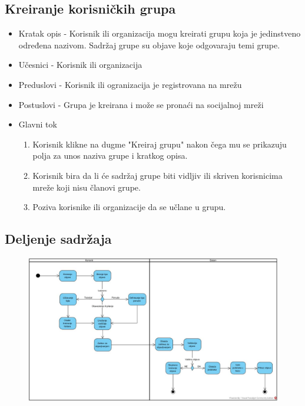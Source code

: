 \subsection{Kreiranje korisničkih grupa}
\begin{itemize}
	\item Kratak opis - Korisnik ili organizacija mogu kreirati grupu koja je jedinstveno određena nazivom. Sadržaj grupe su objave koje odgovaraju temi grupe.
	\item Učesnici - Korisnik ili organizacija
	\item Preduslovi - Korisnik ili ogranizacija je registrovana na mrežu
	\item Postuslovi - Grupa je kreirana i može se pronaći na socijalnoj mreži 
	\item Glavni tok
    \begin{enumerate}
		\item Korisnik klikne na dugme "Kreiraj grupu" nakon čega mu se prikazuju polja za unos naziva grupe i kratkog opisa.
		\item Korisnik bira da li će sadržaj grupe biti vidljiv ili skriven korisnicima mreže koji nisu članovi grupe.
		\item Poziva korisnike ili organizacije da se učlane u grupu.
    \end{enumerate}
\end{itemize}


\subsection{Deljenje sadržaja}
\begin{figure}[h!]
		\centerline{\includegraphics[width=\textwidth]{slike/deljenje_sadrzaja.jpg}}
\end{figure}

